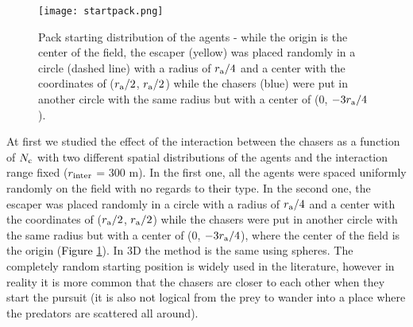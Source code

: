 \documentclass[12pt,a4paper,final]{iopart}
\newcommand{\revision}{\textcolor{black}}
\begin{document}
\begin{figure}
\begin{center}
\texttt{[image: startpack.png]}
\caption{Pack starting distribution of the agents - while the origin is the center of the field, the escaper (yellow) was placed randomly in a circle  (dashed line) with a radius of $r_{\rm a}/4$ and a center with the coordinates of ($r_{\rm a}/2$, $r_{\rm a}/2$)  while the chasers (blue) were put in another circle with the same radius but with a center of ($0$, $-3r_{\rm a}/4$).}
\label{fig:pack}
\end{center}
\end{figure}
At first we studied the effect of the interaction between the chasers as a function of $N_{\rm c}$ with two different spatial distributions of the agents and the interaction range fixed ($r_{\rm inter}$ = 300 m). In the first one, all the agents were spaced uniformly randomly on the field with no regards to their type. In the second one, the escaper was placed randomly in a circle with a radius of $r_{\rm a}/4$ and a center with the coordinates of ($r_{\rm a}/2$, $r_{\rm a}/2$) while the chasers were put in another circle with the same radius but with a center of ($0$, $-3r_{\rm a}/4$), where the center of the field is the origin (\revision{Figure \ref{fig:pack}}). In 3D the method is the same using spheres. The completely random starting position is widely used in the literature, however in reality it is more common that the chasers are closer to each other when they start the pursuit (it is also not logical from the prey to wander into a place where the predators are scattered all around). 
\end{document}
